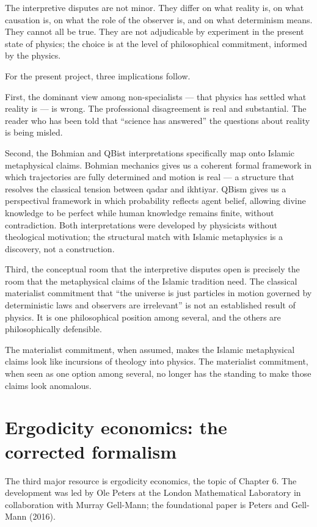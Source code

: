 The interpretive disputes are not minor. They differ on what
reality is, on what causation is, on what the role of the observer
is, and on what determinism means. They cannot all be true. They are
not adjudicable by experiment in the present state of physics; the
choice is at the level of philosophical commitment, informed by the
physics.

For the present project, three implications follow.

First, the dominant view among non-specialists --- that physics
has settled what reality is --- is wrong. The professional
disagreement is real and substantial. The reader who has been told
that ``science has answered'' the questions about reality is being
misled.

Second, the Bohmian and QBist interpretations specifically map onto
Islamic metaphysical claims. Bohmian mechanics gives us a coherent
formal framework in which trajectories are fully determined and
motion is real --- a structure that resolves the classical tension
between qadar and ikhtiyar. QBism gives us a perspectival framework
in which probability reflects agent belief, allowing divine knowledge
to be perfect while human knowledge remains finite, without
contradiction. Both interpretations were developed by physicists
without theological motivation; the structural match with Islamic
metaphysics is a discovery, not a construction.

Third, the conceptual room that the interpretive disputes open is
precisely the room that the metaphysical claims of the Islamic
tradition need. The classical materialist commitment that ``the
universe is just particles in motion governed by deterministic laws
and observers are irrelevant'' is not an established result of
physics. It is one philosophical position among several, and the
others are philosophically defensible.

The materialist commitment, when assumed, makes the Islamic
metaphysical claims look like incursions of theology into physics.
The materialist commitment, when seen as one option among several,
no longer has the standing to make those claims look anomalous.

\section{Ergodicity economics: the corrected formalism}
\label{sec:ergodicity-prelim}

The third major resource is ergodicity economics, the topic of
Chapter 6. The development was led by Ole Peters at the London
Mathematical Laboratory in collaboration with Murray Gell-Mann; the
foundational paper is Peters and Gell-Mann (2016).

